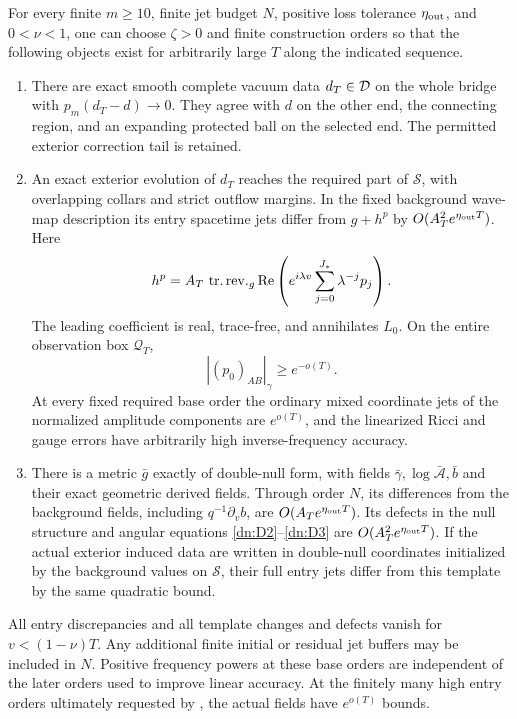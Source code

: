 \begin{proposition}\label{prop:packet-preparation}
For every finite $m\ge10$, finite jet budget $N$, positive loss
tolerance $\eta_{\rm out}$, and $0<\nu<1$, one can choose $\zeta>0$ and
finite construction orders so that the following objects exist
for arbitrarily large $T$ along the indicated sequence.
\begin{enumerate}
\item There are exact smooth complete vacuum data $d_T\in\mathcal D$
on the whole bridge with $p_m(d_T-d)\to0$. They agree with $d$ on
the other end, the connecting region, and an expanding protected
ball on the selected end. The permitted exterior correction tail
is retained.
\item An exact exterior evolution of $d_T$ reaches the required
part of $\mathcal S$, with overlapping collars and strict outflow
margins. In the fixed background wave-map description its entry
spacetime jets differ from $g+h^p$ by $O(A_T^2e^{\eta_{\rm out} T})$.
Here
\begin{equation}\label{pk:packet}
 h^p=A_T\,\operatorname{tr.rev.}_g\operatorname{Re}
       \left(e^{i\lambda v}\sum_{j=0}^{J_*}\lambda^{-j}p_j\right).
\end{equation}
The leading coefficient is real, trace-free, and annihilates
$L_0$. On the entire observation box $\mathcal Q_T$,
\begin{equation}\label{pk:screen-lower}
 |(p_0)_{AB}|_\gamma\ge e^{-o(T)}.
\end{equation}
At every fixed required base order the ordinary mixed coordinate jets
of the normalized amplitude components are $e^{o(T)}$, and the linearized Ricci and gauge errors have
arbitrarily high inverse-frequency accuracy.
\item There is a metric $\bar g$ exactly of double-null form, with
fields $\bar\gamma,\log\bar{\mathcal A},\bar b$ and their exact
geometric derived fields. Through order $N$, its differences from
the background fields, including $q^{-1}\partial_vb$, are
$O(A_T e^{\eta_{\rm out} T})$. Its defects in the null structure and
angular equations \eqref{dn:D2}--\eqref{dn:D3} are
$O(A_T^2e^{\eta_{\rm out} T})$. If the actual exterior induced data are
written in double-null coordinates initialized by the background
values on $\mathcal S$, their full entry jets differ from this
template by the same quadratic bound.
\end{enumerate}
All entry discrepancies and all template changes and defects vanish
for $v<(1-\nu)T$. Any additional finite initial or residual jet
buffers may be included in $N$. Positive frequency powers at these
base orders are independent of the later orders used to improve
linear accuracy. At the finitely many high entry orders ultimately
requested by , the actual fields have
$e^{o(T)}$ bounds.
\end{proposition}

